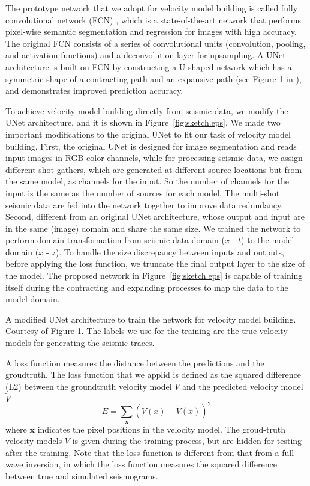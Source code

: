 \documentclass{segabs}
\begin{document}
The prototype network that we adopt for velocity model building is called fully convolutional network (FCN) \citep{long15}, which is a state-of-the-art network that performs pixel-wise semantic segmentation and regression for images with high accuracy. The original FCN consists of a series of convolutional units (convolution, pooling, and activation functions) and a deconvolution layer for upsampling. A UNet architecture \citep{ronneberger15} is built on FCN by constructing a U-shaped network which has a symmetric shape of a contracting path and an expansive path (see Figure 1 in \citet{ronneberger15}), and demonstrates improved prediction accuracy. 

To achieve velocity model building directly from seismic data, we modify the UNet architecture, and it is shown in Figure~\ref{fig:sketch.eps}.
We made two important modifications to the original UNet to fit our task of velocity model building. 
First, the original UNet is designed for image segmentation and reads input images in RGB color channels, while for processing seismic data, we assign different shot gathers, which are generated at different source locations but from the same model, as channels for the input. So the number of channels for the input is the same as the number of sources for each model. The multi-shot seismic data are fed into the network together to improve data redundancy. Second, different from an original UNet architecture, whose output and input are in the same (image) domain and share the same size. We trained the network to perform domain transformation from seismic data domain ($x$ - $t$) to the model domain ($x$ - $z$). To handle the size discrepancy between inputs and outputs, before applying the loss function, we truncate the final output layer to the size of the model. The proposed network in Figure~\ref{fig:sketch.eps} is capable of training itself during the contracting and expanding processes to map the data to the model domain.

{A modified UNet architecture to train the network for velocity model building. Courtesy of \citet{ronneberger15} Figure 1.}
The labels we use for the training are the true velocity models for generating the seismic traces.

A loss function measures the distance between the predictions and the groudtruth. The loss function that we applid is defined as the squared difference (L2) between the groundtruth velocity model $V$ and the predicted velocity model $\tilde{V}$
\begin{equation}
E = \sum_{\boldsymbol{x}} (V(x)-\tilde{V}(x))^2
\label{loss}
\end{equation}
where $\boldsymbol{x}$ indicates the pixel positions in the velocity model. The groud-truth velocity models $V$ is given during the training process, but are hidden for testing after the training. Note that the loss function is different from that from a full wave inversion, in which the loss function measures the squared difference between true and simulated seismograms.
\end{document}
